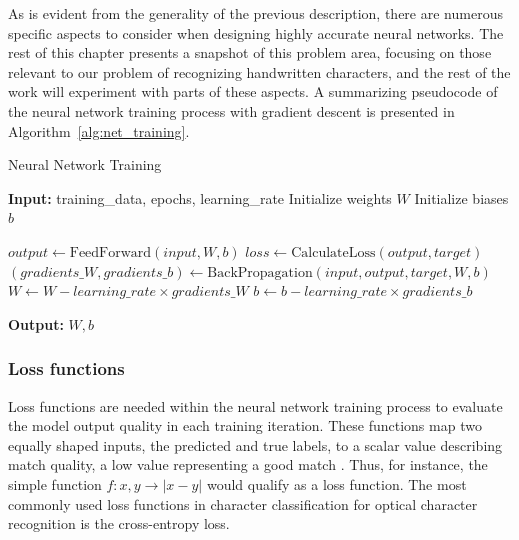 \documentclass{article}
\begin{document}
As is evident from the generality of the previous description, there are numerous 
specific aspects to consider when designing highly accurate neural networks. The 
rest of this chapter presents a snapshot of this problem area, focusing on those 
relevant to our problem of recognizing handwritten characters, and the rest of the 
work will experiment with parts of these aspects. A summarizing pseudocode of the 
neural network training process with gradient descent is presented in Algorithm~\ref{alg:net_training}.

\begin{algorithm}
    \caption{Neural Network Training}
    \begin{algorithmic}[1]
        \State \textbf{Input:} training\_data, epochs, learning\_rate
        \State Initialize weights $W$
        \State Initialize biases $b$
        
                \State $output \gets \text{FeedForward}(input, W, b)$
                \State $loss \gets \text{CalculateLoss}(output, target)$
                \State $(gradients\_W, gradients\_b) \gets \text{BackPropagation}(input, output, target, W, b)$
                \State $W \gets W - learning\_rate \times gradients\_W$
                \State $b \gets b - learning\_rate \times gradients\_b$
            \EndFor
        \EndFor
        
        \State \textbf{Output:} $W, b$  
    \end{algorithmic}
    \label{alg:net_training}
\end{algorithm}

\subsubsection{Loss functions}
\label{sect:loss_funcs}

Loss functions are needed within the neural network training process to evaluate the model output 
quality in each training iteration. These functions map two equally shaped inputs, the predicted 
and true labels, to a scalar value describing match quality, a low value representing a good match \cite{princebook}. 
Thus, for instance, the simple function $f: x,y \rightarrow |x-y|$  would qualify as a loss function.
The most commonly used loss functions in character classification for optical character recognition is 
the cross-entropy loss.
\end{document}
